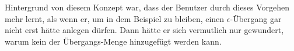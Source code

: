 Hintergrund von diesem Konzept war, dass der Benutzer durch dieses Vorgehen mehr
lernt, als wenn er, um in dem Beispiel zu bleiben, einen $\epsilon$-Übergang gar
nicht erst hätte anlegen dürfen. Dann hätte er sich vermutlich nur gewundert,
warum kein \Symbol{$\epsilon$} der Übergangs-Menge hinzugefügt werden kann.

